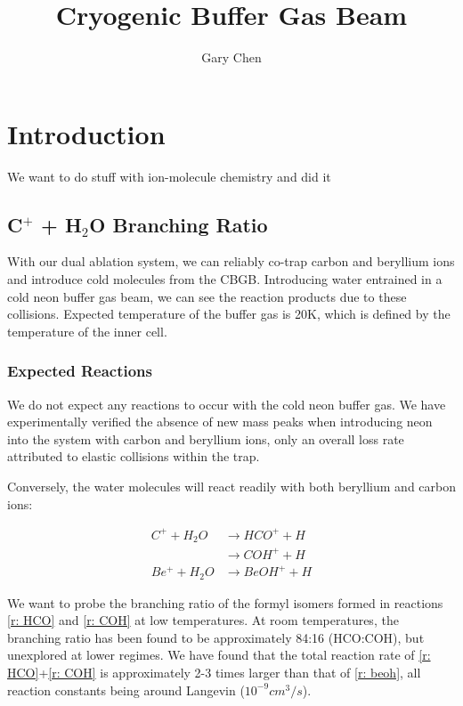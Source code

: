 \documentclass[a4paper]{article}
\title{Cryogenic Buffer Gas Beam}
\author{Gary Chen}
\begin{document}
\maketitle

\section{Introduction}

We want to do stuff with ion-molecule chemistry and did it

\subsection{C$^+$ + H$_2$O Branching Ratio}

With our dual ablation system, we can reliably co-trap carbon and beryllium ions and introduce cold molecules from the CBGB. Introducing water entrained in a cold neon buffer gas beam, we can see the reaction products due to these collisions. Expected temperature of the buffer gas is 20K, which is defined by the temperature of the inner cell.

\subsubsection{Expected Reactions}

We do not expect any reactions to occur with the cold neon buffer gas. We have experimentally verified the absence of new mass peaks when introducing neon into the system with carbon and beryllium ions, only an overall loss rate attributed to elastic collisions within the trap.

Conversely, the water molecules will react readily with both beryllium and carbon ions:

\begin{align}
C^+ +H_2O & \rightarrow HCO^+ + H \label{r: HCO} \\
& \rightarrow COH^+ + H \label{r: COH} \\
Be^+ + H_2O & \rightarrow BeOH^+ + H  \label{r: beoh}
\end{align}

We want to probe the branching ratio of the formyl isomers formed in reactions \ref{r: HCO} and \ref{r: COH} at low temperatures. At room temperatures, the branching ratio has been found to be approximately 84:16 (HCO:COH)\cite{Freeman1987}, but unexplored at lower regimes. We have found that the total reaction rate of \ref{r: HCO}+\ref{r: COH} is approximately 2-3 times larger than that of \ref{r: beoh}, all reaction constants being around Langevin ($10^{-9} cm^3/s$).
\end{document}
